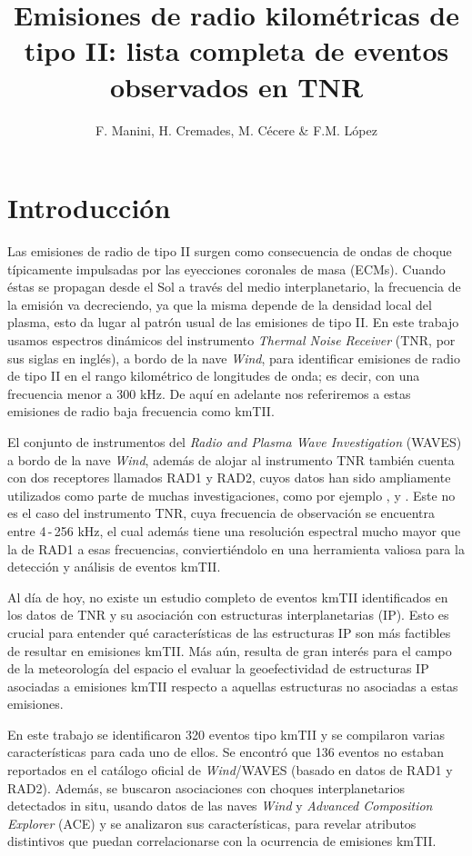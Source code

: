\documentclass[baaa]{baaa}
\title{Emisiones de radio kilom\'etricas de tipo II: lista completa de eventos observados en TNR}
\author{F. Manini\inst{1}, H. Cremades\inst{1}, M. Cécere \inst{2} \& F.M. L\'opez \inst{1}
}
\institute{
Grupo de Estudios en Heliofisica de Mendoza, Universidad de Mendoza, Argentina
\and
Instituto de Astronom{\'\i}a Te\'orica y Experimental, CONICET--UNC, Argentina
}
\begin{document}
\maketitle
\section{Introducci\'on}\label{S_intro}

Las emisiones de radio de tipo II surgen como consecuencia de ondas de choque típicamente impulsadas por las eyecciones coronales de masa (ECMs). Cuando éstas se propagan desde el Sol a través del medio interplanetario, la frecuencia de la emisión va decreciendo, ya que la misma depende de la densidad local del plasma, esto da lugar al patrón usual de las emisiones de tipo II.
En este trabajo usamos espectros dinámicos del instrumento \textit{Thermal Noise Receiver} (TNR, por sus siglas en inglés), a bordo de la nave \textit{Wind}, para identificar emisiones de radio de tipo II en el rango kilométrico de longitudes de onda; es decir, con una frecuencia menor a 300 kHz. De aquí en adelante nos referiremos a estas emisiones de radio baja frecuencia como kmTII.

El conjunto de instrumentos del \textit{Radio and Plasma Wave Investigation} (WAVES) \citep{Bougeret95} a bordo de la nave \textit{Wind}, además de alojar al instrumento TNR también cuenta con dos receptores llamados RAD1 y RAD2, cuyos datos han sido ampliamente utilizados como parte de muchas investigaciones, como por ejemplo \cite{gopal}, \cite{krupar} y \cite{makela}. Este no es el caso del instrumento TNR, cuya frecuencia de observación se encuentra entre 4\,-\,256 kHz, el cual además tiene una resolución espectral mucho mayor que la de RAD1 a esas frecuencias, conviertiéndolo en una herramienta valiosa para la detección y análisis de eventos kmTII.

Al día de hoy, no existe un estudio completo de eventos kmTII identificados en los datos de TNR y su asociación con estructuras interplanetarias (IP). Esto es crucial para entender qué características de las estructuras IP son más factibles de resultar en emisiones kmTII. Más aún, resulta de gran interés para el campo de la meteorología del espacio el evaluar la geoefectividad de estructuras IP asociadas a emisiones kmTII respecto a aquellas estructuras no asociadas a estas emisiones.

En este trabajo se identificaron 320 eventos tipo kmTII y se compilaron varias características para cada uno de ellos. Se encontró que 136 eventos no estaban reportados en el catálogo oficial de \textit{Wind}/WAVES (basado en datos de RAD1 y RAD2).
Además, se buscaron asociaciones con choques interplanetarios detectados in situ, usando datos de las naves \textit{Wind} y \textit{Advanced Composition Explorer} (ACE) y se analizaron sus características, para revelar atributos distintivos que puedan correlacionarse con la ocurrencia de emisiones kmTII.
\end{document}
